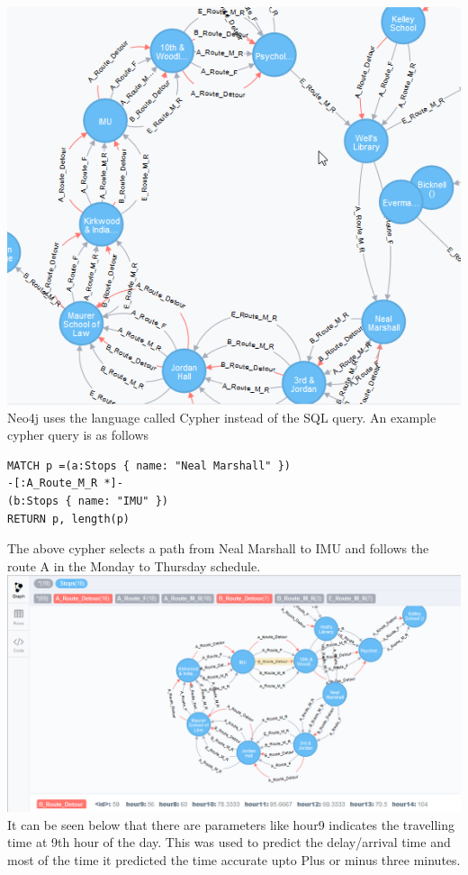 \documentclass[12pt]{article}\usepackage[]{graphicx}\usepackage[]{color}
\begin{document}
\includegraphics[scale=0.8]{resources/neo4j2}\\[1cm] 
Neo4j uses the language called Cypher instead of the SQL query. An example cypher query is as follows\\
\begin{verbatim}
MATCH p =(a:Stops { name: "Neal Marshall" })
-[:A_Route_M_R *]-
(b:Stops { name: "IMU" })
RETURN p, length(p)
\end{verbatim}
The above cypher selects a path from Neal Marshall to IMU and follows the route A in the Monday to Thursday schedule.\\
\includegraphics[scale=0.45]{resources/neo4j3}\\[1cm] 
It can be seen below that there are parameters like hour9 indicates the travelling time at 9th hour of the day. This was used to predict the delay/arrival time and most of the time it predicted the time accurate upto Plus or minus three minutes.\\ \\
\end{document}
